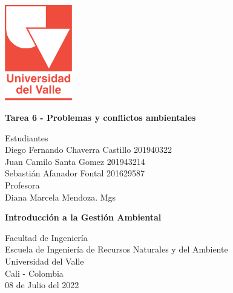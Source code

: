 \begin{titlepage}
    \begin{center}
        \vspace*{1cm}

        \begin{Huge}
        \end{Huge}

        \includegraphics[width=0.22\textwidth]{img/universidadDelValle.png}
        
        \vfill
        \textbf{Tarea 6 - Problemas y conflictos ambientales}\\
        \vfill
        
        Estudiantes\\
        Diego Fernando Chaverra Castillo 201940322\\
        Juan Camilo Santa Gomez 201943214\\
        Sebastián Afanador Fontal 201629587\\
        \vfill
        Profesora\\
        Diana Marcela Mendoza. Mgs
        
        
        \vfill

        \textbf{Introducción a la Gestión Ambiental}
        
        \vfill
           
        Facultad de Ingeniería\\
        Escuela de Ingeniería de Recursos Naturales y del Ambiente\\
        Universidad del Valle\\
        Cali - Colombia\\
        \vfill
        08 de Julio del 2022

    \end{center}
\end{titlepage}